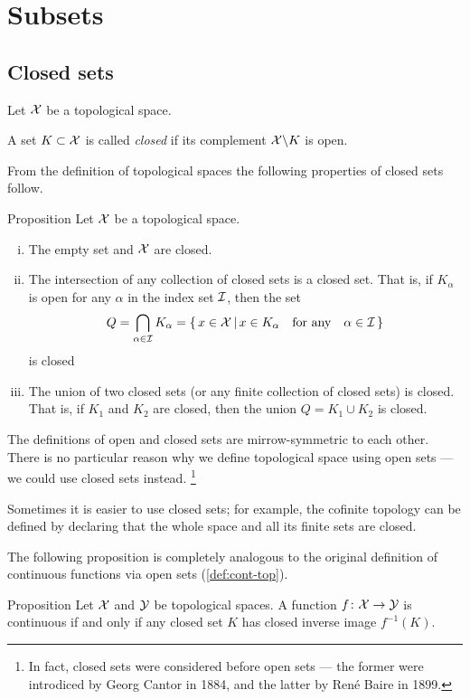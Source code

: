 \chapter{Subsets}

\section{Closed sets}

Let $\mathcal{X}$ be a topological space. 

A set $K\subset \mathcal{X}$ is called \emph{closed} if its complement $\mathcal{X}\backslash K$ is open.

From the definition of topological spaces the following properties of closed sets follow.

\begin{thm}{Proposition}\label{prop:closed-properties}
Let $\mathcal{X}$ be a topological space. 
\begin{enumerate}[(i)] 
\item The empty set and $\mathcal{X}$ are closed.
\item The intersection of any collection of closed sets is a closed set.
That is, if $K_\alpha$ is open for any $\alpha$ in the index set $\mathcal{I}$,
then the set
\[Q=\bigcap_{\alpha\in \mathcal{I}} K_\alpha
=
\left\{\,{x\in \mathcal{X}}\,\middle|\,{x\in K_\alpha\quad\text{for any}\quad\alpha\in \mathcal{I}}\,\right\}\]
is closed
\item\label{def:top-space:n} 
The union of two closed sets (or any finite collection of closed sets) is closed.  
That is,  if $K_1$ and $K_2$ are closed, then the union $Q=K_1 \cup K_2$ is closed. 
\end{enumerate}
\end{thm}

The definitions of open and closed sets are mirrow-symmetric to each other.
There is no particular reason why we define topological space using open sets --- we could use closed sets instead.%
\footnote{In fact, closed sets were considered before open sets --- the former were introdiced by Georg Cantor in 1884, and the latter by René Baire in 1899.}

Sometimes it is easier to use closed sets; 
for example, the cofinite topology can be defined by declaring that the whole space and all its finite sets are closed.

The following proposition is completely analogous to the original definition of continuous functions via open sets (\ref{def:cont-top}). 

\begin{thm}{Proposition}\label{prop:cont-closed}
Let $\mathcal{X}$ and $\mathcal{Y}$ be topological spaces.
A function $f\colon\mathcal{X}\to\mathcal{Y}$ is continuous if and only if any closed set $K$ has closed inverse image $f^{-1}(K)$.
\end{thm}


